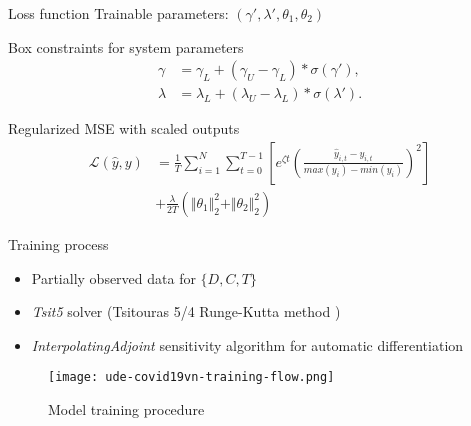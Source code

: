 \begin{frame}{Loss function}
    Trainable parameters: $(\gamma', \lambda', \theta_1, \theta_2)$
    \begin{block}{Box constraints for system parameters}
        \begin{equation*}
            \begin{aligned}
                \gamma &= \gamma_L + (\gamma_U - \gamma_L) * \sigma (\gamma'), \\
                \lambda &= \lambda_L + (\lambda_U - \lambda_L) * \sigma (\lambda').
            \end{aligned}
        \end{equation*}
    \end{block}

    \begin{block}{Regularized MSE with scaled outputs}
        \begin{equation*}
            \begin{aligned}
            \mathcal{L}(\hat{y}, y)
            &= \frac{1}{T} \sum_{i=1}^N \sum_{t=0}^{T-1} \left[ e^{\zeta t} \left(\frac{\hat{y}_{i,t} - y_{i,t}}{max(y_i) - min(y_i)}\right)^2\right]\\
            &+ \frac{\lambda}{2T} (\Vert\theta_1\Vert^2_2 + \Vert\theta_2\Vert^2_2)
            \end{aligned}
            \label{eq:ude-model-loss}
        \end{equation*}
    \end{block}
\end{frame}

\begin{frame}[allowframebreaks]{Training process}
    \begin{itemize}
        \item Partially observed data for $\lbrace D, C, T \rbrace$
        \item \textit{Tsit5} solver (Tsitouras 5/4 Runge-Kutta method \cite{tsitourasRungeKuttaPairs2011})
        \item \textit{InterpolatingAdjoint} sensitivity algorithm for automatic differentiation
    \end{itemize}

    \framebreak

    \begin{figure}[h]
        \centering
        \texttt{[image: ude-covid19vn-training-flow.png]}
        \caption[Training procedure]{Model training procedure}
        \label{fig:model-training-flow}
    \end{figure}

\end{frame}

